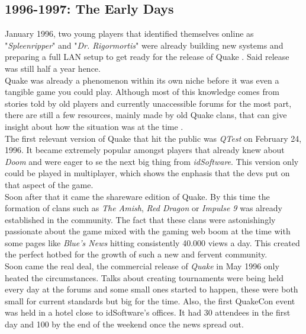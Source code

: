 \subsection{1996-1997: The Early Days}

January 1996, two young players that identified themselves online as "\textit{Spleenripper}" and "\textit{Dr. Rigormortis}" were already building new systems and preparing a full LAN setup to get ready for the release of Quake \citep{clanHistory}. Said release was still half a year hence.\\

Quake was already a phenomenon within its own niche before it was even a tangible game you could play.  Although most of this knowledge comes from stories told by old players and currently unaccessible forums for the most part, there are still a few resources, mainly made by old Quake clans, that can give insight about how the situation was at the time \citep{clanHistory}.\\

The first relevant version of Quake that hit the public was \textit{QTest} \citep{qtest} on February 24, 1996. It became extremely popular amongst players that already knew about \textit{Doom} \cite{game:doom} and were eager to se the next big thing from \textit{idSoftware}. This version only could be played in multiplayer, which shows the enphasis that the devs put on that aspect of the game.\\

Soon after that it came the shareware edition of Quake. By this time the formation of clans such as \textit{The Amish}, \textit{Red Dragon} or \textit{Impulse 9} was already established in the community. The fact that these clans were astonishingly passionate about the game mixed with the gaming web boom at the time with some pages like \textit{Blue's News} hitting consistently 40.000 views a day. This created the perfect hotbed for the growth of such a new and fervent community.\\

Soon came the real deal, the commercial release of \textit{Quake} \citep{game:quake1} in May 1996 only heated the circumstances. Talks about creating tournaments were being held every day at the forums and some small ones started to happen, these were both small for current standards but big for the time. Also, the first QuakeCon \citep{quakecon} event was held in a hotel close to idSoftware's offices. It had 30 attendees in the first day and 100 by the end of the weekend once the news spread out.\\


